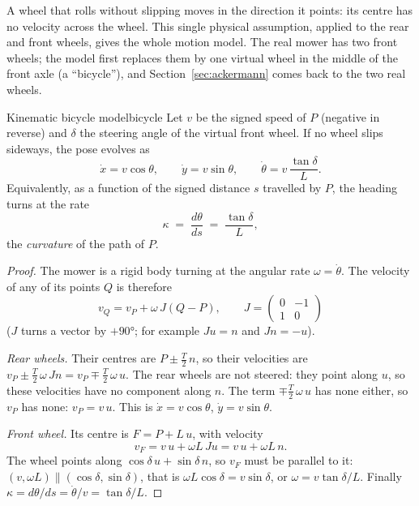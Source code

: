 A wheel that rolls without slipping moves in the direction it points: its
centre has no velocity across the wheel. This single physical assumption,
applied to the rear and front wheels, gives the whole motion model. The real
mower has two front wheels; the model first replaces them by one virtual
wheel in the middle of the front axle (a ``bicycle''), and
Section~\ref{sec:ackermann} comes back to the two real wheels.

\begin{theorem}{Kinematic bicycle model}{bicycle}
  Let $v$ be the signed speed of $P$ (negative in reverse) and $\delta$ the
  steering angle of the virtual front wheel. If no wheel slips sideways, the
  pose evolves as
  \[
    \dot x = v\cos\theta, \qquad
    \dot y = v\sin\theta, \qquad
    \dot\theta = v\,\frac{\tan\delta}{L}.
  \]
  Equivalently, as a function of the signed distance $s$ travelled by $P$,
  the heading turns at the rate
  \[
    \kappa \;=\; \frac{d\theta}{ds} \;=\; \frac{\tan\delta}{L},
  \]
  the \emph{curvature} of the path of $P$.
\end{theorem}

\begin{proof}
  The mower is a rigid body turning at the angular rate $\omega =
  \dot\theta$. The velocity of any of its points $Q$ is therefore
  \[
    v_Q = v_P + \omega\, J(Q - P),
    \qquad J = \begin{pmatrix} 0 & -1 \\ 1 & 0 \end{pmatrix}
  \]
  ($J$ turns a vector by $+90°$; for example $J u = n$ and $J n = -u$).

  \emph{Rear wheels.} Their centres are $P \pm \tfrac T2\,n$, so their
  velocities are $v_P \pm \tfrac T2\,\omega\,J n = v_P \mp \tfrac T2\,\omega
  \,u$. The rear wheels are not steered: they point along $u$, so these
  velocities have no component along $n$. The term $\mp\tfrac T2\,\omega\,u$
  has none either, so $v_P$ has none: $v_P = v\,u$. This is
  $\dot x = v\cos\theta$, $\dot y = v\sin\theta$.

  \emph{Front wheel.} Its centre is $F = P + L\,u$, with velocity
  \[
    v_F = v\,u + \omega L\, J u = v\,u + \omega L\, n .
  \]
  The wheel points along $\cos\delta\,u + \sin\delta\,n$, so $v_F$ must be
  parallel to it: $(v, \omega L) \parallel (\cos\delta, \sin\delta)$, that
  is $\omega L\cos\delta = v\sin\delta$, or $\omega = v\tan\delta / L$.
  Finally $\kappa = d\theta/ds = \dot\theta / v = \tan\delta / L$.
\end{proof}

